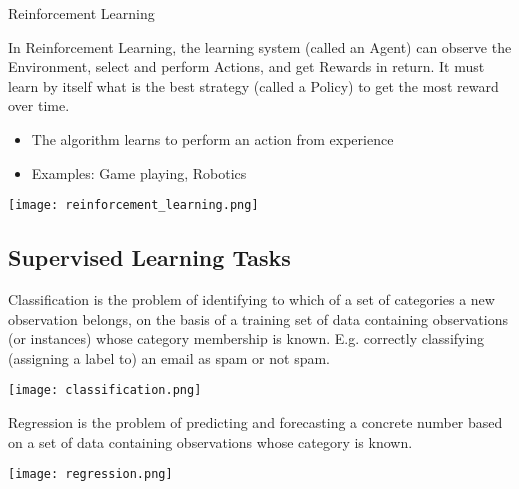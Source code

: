 \begin{concept}{Reinforcement Learning}

    \begin{minipage}{0.6\linewidth}
    In Reinforcement Learning, the learning system (called an Agent) can observe the Environment, select and perform Actions, and get Rewards in return. It must learn by itself what is the best strategy (called a Policy) to get the most reward over time.
    \begin{itemize}
        \item The algorithm learns to perform an action from experience
        \item Examples: Game playing, Robotics
    \end{itemize}
    \end{minipage}
    \begin{minipage}{0.38\linewidth}
    \texttt{[image: reinforcement\_learning.png]}
    \end{minipage}
\end{concept}

\subsection{Supervised Learning Tasks}


\begin{definition}{Classification}
    is the problem of identifying to which of a set of categories a new observation belongs, on the basis of a training set of data containing observations (or instances) whose category membership is known. 
    E.g. correctly classifying (assigning a label to) an email as spam or not spam.

    \texttt{[image: classification.png]}
\end{definition}

\begin{definition}{Regression}
    is the problem of predicting and forecasting a concrete number based on a set of data containing observations whose category is known.

    \texttt{[image: regression.png]}
\end{definition}

\raggedcolumns


